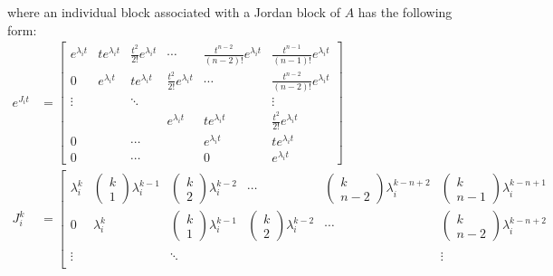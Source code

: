 \documentclass[twoside, 11pt]{article}
\begin{document}
%
where an individual block associated with a Jordan block of $A$ has the following form:
%
\begin{align*}
e^{J_i t} &= \left[  \begin{array}{cccccc} e^{\lambda_i t} & t e^{\lambda_i t} & \frac{t^2}{2 !} e^{\lambda_i t} 
& \cdots & \frac{t^{n-2}}{(n-2) !} e^{\lambda_i t}  & \frac{t^{n-1}}{(n-1) !} e^{\lambda_i t}
\\ 0 & e^{\lambda_i t} & t e^{\lambda_i t} & \frac{t^2}{2 !} e^{\lambda_i t} & \cdots  & \frac{t^{n-2}}{(n-2) !} e^{\lambda_i t}
\\  \vdots &  & \ddots &  &  & \vdots \\ 
& & & e^{\lambda_i t} & t e^{\lambda_i t} & \frac{t^2}{2 !} e^{\lambda_i t}
\\ 0 &  & \cdots  &  & e^{\lambda_i t} & t e^{\lambda_i t} \\
0 &  & \cdots &  & 0 & e^{\lambda_i t} \end{array} \right] 
\\
J_i^k &= \left[  \begin{array}{cccccc} \lambda_i^k & \begin{pmatrix} k \\ 1 \end{pmatrix} \lambda_i^{k-1} & \begin{pmatrix} k \\ 2 \end{pmatrix}  \lambda_i^{k-2} 
& \cdots & \begin{pmatrix} k \\ n-2 \end{pmatrix} \lambda_i^{k-n+2} & \begin{pmatrix} k \\ n-1 \end{pmatrix} \lambda_i^{k-n+1}
\\ 0 & \lambda_i^k & \begin{pmatrix} k \\ 1 \end{pmatrix}  \lambda_i^{k-1} & \begin{pmatrix} k \\ 2 \end{pmatrix} \lambda_i^{k-2} & \cdots  & \begin{pmatrix} k \\ n-2 \end{pmatrix} \lambda_i^{k-n+2}
\\ 
\\  \vdots &  & \ddots &  &  & \vdots \\ 

\end{array}
\end{align*}
\end{document}
